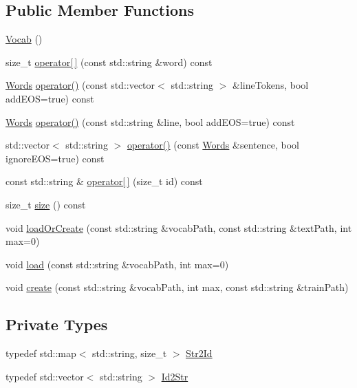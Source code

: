 \subsection*{Public Member Functions}
\begin{DoxyCompactItemize}
\item 
\hyperlink{classmarian_1_1Vocab_a0e99d044198e23cd5187d09883e326ca}{Vocab} ()
\item 
size\+\_\+t \hyperlink{classmarian_1_1Vocab_aac39bcbded54b4a3d173a8db4c37d5fe}{operator\mbox{[}$\,$\mbox{]}} (const std\+::string \&word) const 
\item 
\hyperlink{namespacemarian_a5385eef6e49dd8f789f616ef579dea3f}{Words} \hyperlink{classmarian_1_1Vocab_a2d83592871711da3b20c7a582be4b743}{operator()} (const std\+::vector$<$ std\+::string $>$ \&line\+Tokens, bool add\+E\+OS=true) const 
\item 
\hyperlink{namespacemarian_a5385eef6e49dd8f789f616ef579dea3f}{Words} \hyperlink{classmarian_1_1Vocab_adf744607f7b211cf64541d00d0fd9ab6}{operator()} (const std\+::string \&line, bool add\+E\+OS=true) const 
\item 
std\+::vector$<$ std\+::string $>$ \hyperlink{classmarian_1_1Vocab_a7e70e0e9345e36e8cf8960595e86d409}{operator()} (const \hyperlink{namespacemarian_a5385eef6e49dd8f789f616ef579dea3f}{Words} \&sentence, bool ignore\+E\+OS=true) const 
\item 
const std\+::string \& \hyperlink{classmarian_1_1Vocab_a3e12519d40e2f1193741a86303b842e0}{operator\mbox{[}$\,$\mbox{]}} (size\+\_\+t id) const 
\item 
size\+\_\+t \hyperlink{classmarian_1_1Vocab_a459153ecfdd0c3ad6b256752adda0e84}{size} () const 
\item 
void \hyperlink{classmarian_1_1Vocab_a68171b2369e02232e4e24b04934256a9}{load\+Or\+Create} (const std\+::string \&vocab\+Path, const std\+::string \&text\+Path, int max=0)
\item 
void \hyperlink{classmarian_1_1Vocab_a8387e1e9b7923b9d84c0b4defd25bd76}{load} (const std\+::string \&vocab\+Path, int max=0)
\item 
void \hyperlink{classmarian_1_1Vocab_aeb5be1eaae536e408eac5ab06f50d9c1}{create} (const std\+::string \&vocab\+Path, int max, const std\+::string \&train\+Path)
\end{DoxyCompactItemize}
\subsection*{Private Types}
\begin{DoxyCompactItemize}
\item 
typedef std\+::map$<$ std\+::string, size\+\_\+t $>$ \hyperlink{classmarian_1_1Vocab_a3ff740ce19200167d306de3643bd49e3}{Str2\+Id}
\item 
typedef std\+::vector$<$ std\+::string $>$ \hyperlink{classmarian_1_1Vocab_a9208af73b752aeed1ce03ae5c429d897}{Id2\+Str}
\end{DoxyCompactItemize}

